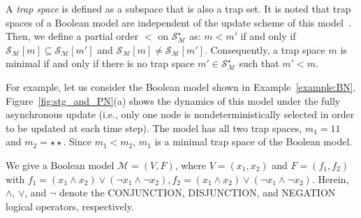 \documentclass[runningheads]{llncs}
\begin{document}
A \emph{trap space} is defined as a subspace that is also a trap set.
It is noted that trap spaces of a Boolean model are independent of the update scheme of this model~\cite{klarner2015computing}.
Then, we define a partial order \(<\) on \(\mathcal{S}_{\mathcal{M}}^{\star}\) as: \(m < m'\) if and only if \(\mathcal{S}_{\mathcal{M}}[m] \subseteq \mathcal{S}_{\mathcal{M}}[m']\) and \(\mathcal{S}_{\mathcal{M}}[m] \neq \mathcal{S}_{\mathcal{M}}[m']\).
Consequently, a trap space \(m\) is minimal if and only if there is no trap space \(m' \in \mathcal{S}_{\mathcal{M}}^{\star}\) such that \(m' < m\).

For example, let us consider the Boolean model shown in Example~\ref{example:BN}.
Figure~\ref{fig:stg_and_PN}(a) shows the dynamics of this model under the fully asynchronous update (i.e., only one node is nondeterministically selected in order to be updated at each time step).
The model has all two trap spaces, \(m_1 = 11\) and \(m_2 = \star\star\).
Since \(m_1 < m_2\), \(m_1\) is a minimal trap space of the Boolean model.

\begin{example}
We give a Boolean model \(\mathcal{M} = (V, F)\), where \(V = (x_1, x_2)\) and \(F = (f_1, f_2)\) with \(f_1 = (x_1 \land x_2) \lor (\neg x_1 \land \neg x_2), f_2 = (x_1 \land x_2) \lor (\neg x_1 \land \neg x_2)\). Herein, \(\land\), \(\lor\), and \(\neg\) denote the CONJUNCTION, DISJUNCTION, and NEGATION logical operators, respectively.
\label{example:BN}
\end{example}
\end{document}

